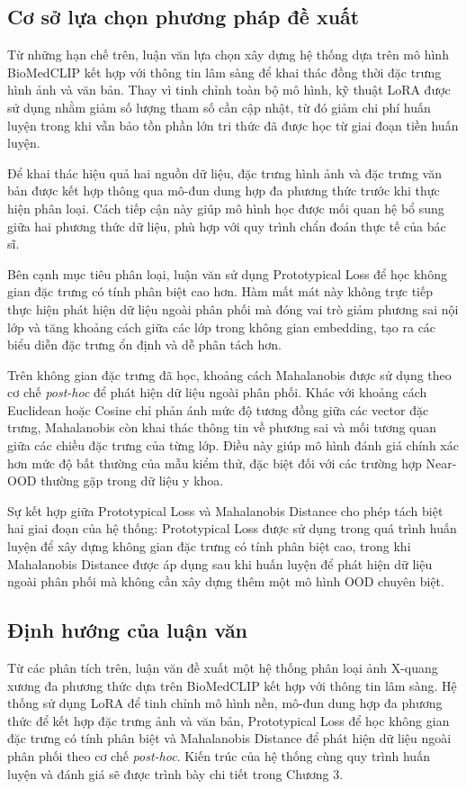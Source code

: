 \subsection{Cơ sở lựa chọn phương pháp đề xuất}

Từ những hạn chế trên, luận văn lựa chọn xây dựng hệ thống dựa trên mô hình BioMedCLIP kết hợp với thông tin lâm sàng để khai thác đồng thời đặc trưng hình ảnh và văn bản. Thay vì tinh chỉnh toàn bộ mô hình, kỹ thuật LoRA được sử dụng nhằm giảm số lượng tham số cần cập nhật, từ đó giảm chi phí huấn luyện trong khi vẫn bảo tồn phần lớn tri thức đã được học từ giai đoạn tiền huấn luyện.

Để khai thác hiệu quả hai nguồn dữ liệu, đặc trưng hình ảnh và đặc trưng văn bản được kết hợp thông qua mô-đun dung hợp đa phương thức trước khi thực hiện phân loại. Cách tiếp cận này giúp mô hình học được mối quan hệ bổ sung giữa hai phương thức dữ liệu, phù hợp với quy trình chẩn đoán thực tế của bác sĩ.

Bên cạnh mục tiêu phân loại, luận văn sử dụng Prototypical Loss để học không gian đặc trưng có tính phân biệt cao hơn. Hàm mất mát này không trực tiếp thực hiện phát hiện dữ liệu ngoài phân phối mà đóng vai trò giảm phương sai nội lớp và tăng khoảng cách giữa các lớp trong không gian embedding, tạo ra các biểu diễn đặc trưng ổn định và dễ phân tách hơn.

Trên không gian đặc trưng đã học, khoảng cách Mahalanobis được sử dụng theo cơ chế \textit{post-hoc} để phát hiện dữ liệu ngoài phân phối. Khác với khoảng cách Euclidean hoặc Cosine chỉ phản ánh mức độ tương đồng giữa các vector đặc trưng, Mahalanobis còn khai thác thông tin về phương sai và mối tương quan giữa các chiều đặc trưng của từng lớp. Điều này giúp mô hình đánh giá chính xác hơn mức độ bất thường của mẫu kiểm thử, đặc biệt đối với các trường hợp Near-OOD thường gặp trong dữ liệu y khoa.

Sự kết hợp giữa Prototypical Loss và Mahalanobis Distance cho phép tách biệt hai giai đoạn của hệ thống: Prototypical Loss được sử dụng trong quá trình huấn luyện để xây dựng không gian đặc trưng có tính phân biệt cao, trong khi Mahalanobis Distance được áp dụng sau khi huấn luyện để phát hiện dữ liệu ngoài phân phối mà không cần xây dựng thêm một mô hình OOD chuyên biệt.

\subsection{Định hướng của luận văn}

Từ các phân tích trên, luận văn đề xuất một hệ thống phân loại ảnh X-quang xương đa phương thức dựa trên BioMedCLIP kết hợp với thông tin lâm sàng. Hệ thống sử dụng LoRA để tinh chỉnh mô hình nền, mô-đun dung hợp đa phương thức để kết hợp đặc trưng ảnh và văn bản, Prototypical Loss để học không gian đặc trưng có tính phân biệt và Mahalanobis Distance để phát hiện dữ liệu ngoài phân phối theo cơ chế \textit{post-hoc}. Kiến trúc của hệ thống cùng quy trình huấn luyện và đánh giá sẽ được trình bày chi tiết trong Chương 3.
